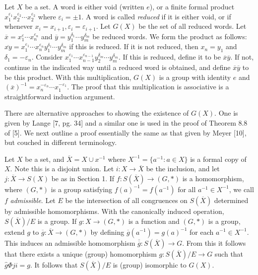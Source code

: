 \documentclass{article}
\begin{document}
Let $X$ be a set. A word is either void (written $e$), or a finite formal product $x_1^{\varepsilon_1} x_2^{\varepsilon_2} {\cdots} x_2^{\varepsilon_2}$ where $\varepsilon_i = \pm 1$. A word is called \emph{reduced} if it is either void, or if whenever $x_i = x_{i+1}, \varepsilon_i = \varepsilon_{i+1}$. Let $G(X)$ be the set of all reduced words. Let $\overline{x} = x_1^\varepsilon \cdots x_n^{\varepsilon_n}$ and $\overline{y} = y_1^{\delta_1} \cdots y_m^{\delta_m}$ be reduced words. We form the product as follows: $\overline{xy} = x_1^{\varepsilon_1} \cdots x_n^{\varepsilon_n} y_1^{\delta_1} \cdots y_m^{\delta_m}$ if this is reduced. If it is not reduced, then $x_n = y_1$ and $\delta_1 = -\varepsilon_n$. Consider $x_1^{\varepsilon_1} \cdots x_{n-1}^{\varepsilon_{n-1}} y_2^{\delta_m} \cdots y_m^{\delta_m}$. If this is reduced, define it to be $\overline{x} \overline{y}$. If not, continue in the indicated way until a reduced word is obtained, and define $\overline{x} \overline{y}$ to be this product. With this multiplication, $G(X)$ is a group with identity $e$ and $(\overline{x})^{-1} = x_n^{-\varepsilon_n} \cdots x_1^{-\varepsilon_1}$. The proof that this multiplication is associative is a straightforward induction argument.

There are alternative approaches to showing the existence of $G(X)$. One is given by Lange [7, pg. 34] and a similar one is used in the proof of Theorem 8.8 of [5]. We next outline a proof essentially the same as that given by Meyer [10], but couched in different terminology.

Let $X$ be a set, and $\overline{X} = X \cup x^{-1}$ where $X^{-1} = \{ a^{-1}: a \in X \}$ is a formal copy of $X$. Note this is a disjoint union. Let $i: X \rightarrow \overline{X}$ be the inclusion, and let $j: \overline{X} \rightarrow S(X)$ be as in Section 1. If $f: S(\overline{X}) \rightarrow (G,*)$ is a homomorphism, where $(G,*)$ is a group satisfying $f(a)^{-1} = f(a^{-1})$ for all $a^{-1} \in X^{-1}$, we call $f$ \emph{admissible}. Let $E$ be the intersection of all congruences on $S(\overline{X})$ determined by admissible homomorphisms. With the canonically induced operation, $S(\overline{X})/E$ is a group. If $g: X \rightarrow (G,*)$ is a function and $(G,*)$ is a group, extend $g$ to $\overline{g}: \overline{X} \rightarrow (G,*)$ by defining $\overline{g}(a^{-1}) = g(a)^{-1}$ for each $a^{-1} \in X^{-1}$. This induces an admissible homomorphism $\overline{\overline{g}}: S(\overline{X}) \rightarrow G$. From this it follows that there exists a unique (group) homomorphism $g: S(\overline{X})/E \rightarrow G$ such that $\hat{g} \Phi ji = g$. It follows that $S(\overline{X})/E$ is (group) isomorphic to $G(X)$.
\end{document}
